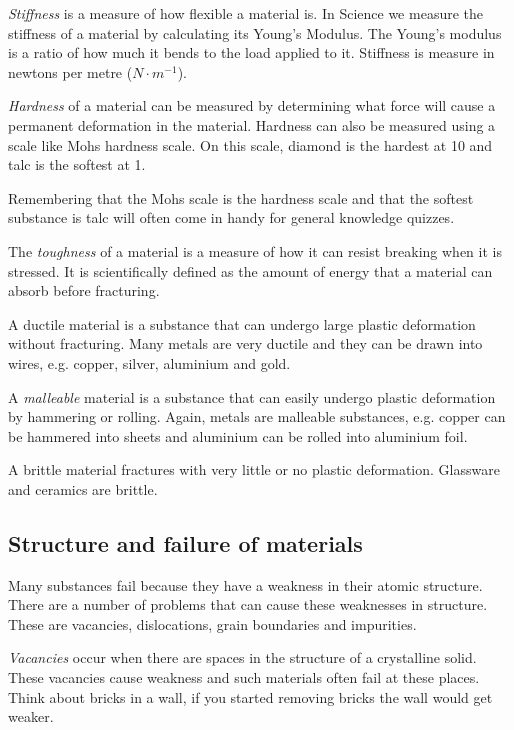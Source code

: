 \emph{Stiffness} is a measure of how flexible a material is. In Science we measure the stiffness of a material by calculating its Young's Modulus. The Young's modulus is a ratio of how much it bends to the load applied to it. Stiffness is measure in newtons per metre ($N \cdot m^{-1}$).
 
\emph{Hardness} of a material can be measured by determining what force will cause a permanent deformation in the material. Hardness can also be measured using a scale like Mohs hardness scale. On this scale, diamond is the hardest at 10 and talc is the softest at 1.

\begin{IFact}{Remembering that the Mohs scale is the hardness scale and that the softest substance is talc will often come in handy for general knowledge quizzes.}\end{IFact}

The \emph{toughness} of a material is a measure of how it can resist breaking when it is stressed. It is scientifically defined as the amount of energy that a material can absorb before fracturing.

A ductile material is a substance that can undergo large plastic deformation without fracturing. Many metals are very ductile and they can be drawn into wires, e.g. copper, silver, aluminium and gold.

A \emph{malleable} material is a substance that can easily undergo plastic deformation by hammering or rolling. Again, metals are malleable substances, e.g. copper can be hammered into sheets and aluminium can be rolled into aluminium foil.
 
A brittle material fractures with very little or no plastic deformation. Glassware and ceramics are brittle.

\subsection{Structure and failure of materials}

Many substances fail because they have a weakness in their atomic structure. There are a number of problems that can cause these weaknesses in structure. These are vacancies, dislocations, grain boundaries and impurities.

\emph{Vacancies} occur when there are spaces in the structure of a crystalline solid. These vacancies cause weakness and such materials often fail at these places. Think about bricks in a wall, if you started removing bricks the wall would get weaker.

